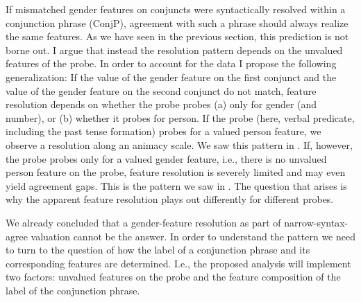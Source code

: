 \documentclass[output=paper,
modfonts
newtxmath,
hidelinks
]{langscibook}
\begin{document}
If mismatched gender features on conjuncts were syntactically resolved within a conjunction phrase (ConjP), agreement with such a phrase should always realize the same features. As we have seen in the previous section, this prediction is not borne out. I argue that instead the resolution pattern depends on the unvalued features of the probe. In order to account for the data I propose the following generalization: If the value of the gender feature on the first conjunct and the value of the gender feature on the second conjunct do not match, feature resolution depends on whether the probe probes (a) only for gender (and number), or (b) whether it probes for person. If the probe (here, verbal predicate, including the past tense formation) probes for a valued person feature, we observe a resolution along an animacy scale. We saw this pattern in . If, however, the probe probes only for a valued gender feature, i.e., there is no unvalued person feature on the probe, feature resolution is severely limited and may even yield agreement gaps. This is the pattern we saw in . The question that arises is why the apparent feature resolution plays out differently for different probes.

We already concluded that a gender-feature resolution as part of narrow-syntax-agree valuation cannot be the answer. In order to understand the pattern we need to turn to the question of how the label of a conjunction phrase and its corresponding features are determined. I.e., the proposed analysis will implement two factors: unvalued features on the probe and the feature composition of the label of the conjunction phrase. 
\end{document}
